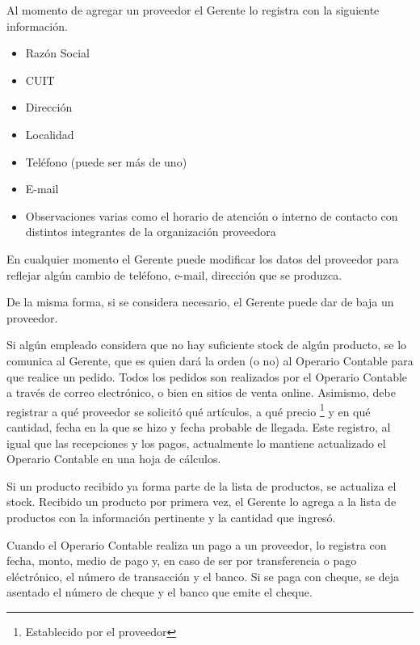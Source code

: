 \documentclass[12pt]{extarticle}
\begin{document}
\begin{spacing}{1.2}
    Al momento de agregar un proveedor el Gerente lo registra con la siguiente información.
        \begin{itemize}
            \item Razón Social
            \item CUIT
            \item Dirección
            \item Localidad
            \item Teléfono (puede ser más de uno)
            \item E-mail
            \item Observaciones varias como el horario de atención o interno de contacto con distintos integrantes de la organización proveedora
        \end{itemize}

    En cualquier momento el Gerente puede modificar los datos del proveedor para reflejar algún cambio de teléfono, e-mail, dirección que se produzca.

    De la misma forma, si se considera necesario, el Gerente puede dar de baja un proveedor. 
    
    Si algún empleado considera que no hay suficiente stock de algún producto, se lo comunica al Gerente, que es quien dará la orden (o no) al Operario Contable para que realice un pedido. Todos los pedidos son realizados por el Operario Contable a través de correo electrónico, o bien en sitios de venta online. Asimismo, debe registrar a qué proveedor se solicitó qué artículos, a qué precio \footnote{Establecido por el proveedor} y en qué cantidad, fecha en la que se hizo y fecha probable de llegada. Este registro, al igual que las recepciones y los pagos, actualmente lo mantiene actualizado el Operario Contable en una hoja de cálculos.

    Si un producto recibido ya forma parte de la lista de productos, se actualiza el stock. Recibido un producto por primera vez, el Gerente lo agrega a la lista de productos con la información pertinente y la cantidad que ingresó. 
        
    Cuando el Operario Contable realiza un pago a un proveedor, lo registra con fecha, monto, medio de pago y, en caso de ser por transferencia o pago eléctrónico, el número de transacción y el banco. Si se paga con cheque, se deja asentado el número de cheque y el banco que emite el cheque.\\



\end{spacing}
\end{document}
